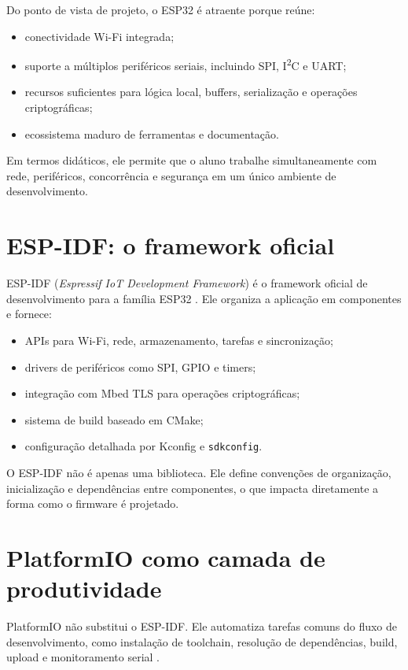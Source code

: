 Do ponto de vista de projeto, o ESP32 é atraente porque reúne:
\begin{itemize}[leftmargin=*]
  \item conectividade Wi-Fi integrada;
  \item suporte a múltiplos periféricos seriais, incluindo SPI, I\textsuperscript{2}C e UART;
  \item recursos suficientes para lógica local, buffers, serialização e operações criptográficas;
  \item ecossistema maduro de ferramentas e documentação.
\end{itemize}

Em termos didáticos, ele permite que o aluno trabalhe simultaneamente com rede, periféricos, concorrência e segurança em um único ambiente de desenvolvimento.

\section{ESP-IDF: o framework oficial}
ESP-IDF (\textit{Espressif IoT Development Framework}) é o framework oficial de desenvolvimento para a família ESP32 \citep{espidf_programming_guide}. Ele organiza a aplicação em componentes e fornece:
\begin{itemize}[leftmargin=*]
  \item APIs para Wi-Fi, rede, armazenamento, tarefas e sincronização;
  \item drivers de periféricos como SPI, GPIO e timers;
  \item integração com Mbed TLS para operações criptográficas;
  \item sistema de build baseado em CMake;
  \item configuração detalhada por Kconfig e \texttt{sdkconfig}.
\end{itemize}

O ESP-IDF não é apenas uma biblioteca. Ele define convenções de organização, inicialização e dependências entre componentes, o que impacta diretamente a forma como o firmware é projetado.

\section{PlatformIO como camada de produtividade}
PlatformIO não substitui o ESP-IDF. Ele automatiza tarefas comuns do fluxo de desenvolvimento, como instalação de toolchain, resolução de dependências, build, upload e monitoramento serial \citep{platformio_espidf,platformio_espressif32}.

